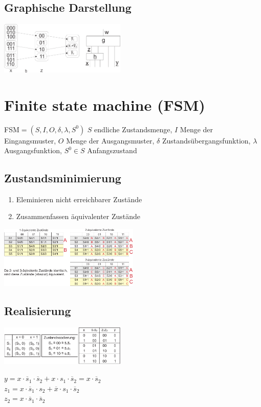 \documentclass[a4paper,twocolumn,10pt]{article}
\begin{document}
\subsection*{Graphische Darstellung}
\includegraphics[width=0.45\textwidth]{Grafiken/Dekomposition2}

\section*{Finite state machine (FSM)}
FSM$=(S,I,O,\delta,\lambda,S^0)$
$S$ endliche Zustandsmenge, $I$ Menge der Eingangsmuster, $O$ Menge der Ausgangsmuster, $\delta$ Zustandsübergangsfunktion, $\lambda$ Ausgangsfunktion, $S^0\in S$ Anfangszustand

\subsection*{Zustandsminimierung}
\begin{enumerate}
	\item Eleminieren nicht erreichbarer Zustände
	\item Zusammenfassen äquivalenter Zustände
\end{enumerate}
\includegraphics[width=0.5\textwidth]{Grafiken/Zustandsminimierung}

\subsection*{Realisierung}
\begin{center}
\includegraphics[width=0.45\textwidth]{Grafiken/FSM-Realisierung}
\end{center}
$y=x\cdot \overline{s}_1\cdot \overline{s}_2+x\cdot s_1\cdot \overline{s}_2 = x\cdot \overline{s}_2$\\
$z_1=x\cdot \overline{s}_1\cdot s_2+\overline{x}\cdot s_1\cdot \overline{s}_2$\\
$z_2=x\cdot \overline{s}_1\cdot \overline{s}_2$
\end{document}
